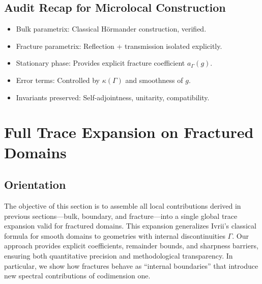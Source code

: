 \subsection*{Audit Recap for Microlocal Construction}
\begin{itemize}
  \item Bulk parametrix: Classical Hörmander construction, verified.
  \item Fracture parametrix: Reflection + transmission isolated explicitly.
  \item Stationary phase: Provides explicit fracture coefficient $a_\Gamma(g)$.
  \item Error terms: Controlled by $\kappa(\Gamma)$ and smoothness of $g$.
  \item Invariants preserved: Self-adjointness, unitarity, compatibility.
\end{itemize}

\section{Full Trace Expansion on Fractured Domains}
\label{sec:full-trace-expansion}

\subsection*{Orientation}
The objective of this section is to assemble all local contributions derived in
previous sections—bulk, boundary, and fracture—into a single global trace
expansion valid for fractured domains. This expansion generalizes Ivrii's
classical formula for smooth domains \cite{Ivrii1980, SafarovVassiliev1997} to
geometries with internal discontinuities $\Gamma$. Our approach provides explicit
coefficients, remainder bounds, and sharpness barriers, ensuring both
quantitative precision and methodological transparency. In particular, we show
how fractures behave as ``internal boundaries'' that introduce new spectral
contributions of codimension one.

